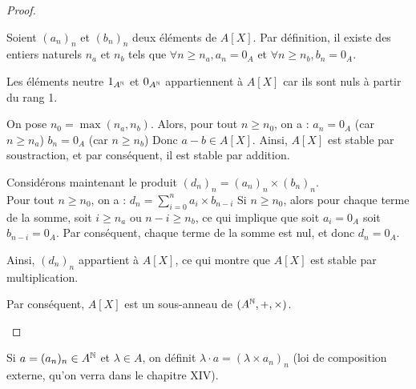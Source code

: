 \documentclass[12pt, a4paper]{report}
\begin{document}
\begin{proof}
    \begin{outline}
        \1 Soient $(a_n)_n$ et $(b_n)_n$ deux éléments de $A[X]$. Par définition, il existe des entiers naturels $n_a$ et $n_b$ tels que $\forall n \ge n_a, a_n = 0_A$ et $\forall n \ge n_b, b_n = 0_A$.

        \1 Les éléments neutre $1_{A^{\mathbb{N}}}$ et $0_{A^{\mathbb{N}}}$ appartiennent à $A[X]$ car ils sont nuls à partir du rang 1.

        \1 On pose $n_0 = \max(n_a, n_b)$. Alors, pour tout $n \ge n_0$, on a :
            \2 $a_n = 0_A$ (car $n \ge n_a$)
            \2 $b_n = 0_A$ (car $n \ge n_b$)
            \2 Donc $a-b \in A[X]$.
        \1 Ainsi, $A[X]$ est stable par soustraction, et par conséquent, il est stable par addition.

        \1 Considérons maintenant le produit $(d_n)_n = (a_n)_n \times (b_n)_n$.\\Pour tout $n \ge n_0$, on a :
            \2 $d_n = \sum_{i=0}^{n} a_i \times b_{n-i}$
            \2 Si $n \ge n_0$, alors pour chaque terme de la somme, soit $i \ge n_a$ ou $n-i \ge n_b$, ce qui implique que soit $a_i = 0_A$ soit $b_{n-i} = 0_A$. Par conséquent, chaque terme de la somme est nul, et donc $d_n = 0_A$.

        \1 Ainsi, $(d_n)_n$ appartient à $A[X]$, ce qui montre que $A[X]$ est stable par multiplication.

        \1 Par conséquent, $A[X]$ est un sous-anneau de $(A^{\mathbb{N}}, +, \times)$.
    \end{outline}
\end{proof}

\begin{remark}
    Si $a = (a_n)_n \in A^{\mathbb{N}}$ et $\lambda \in A$, on définit $\lambda \cdot a = (\lambda \times a_n)_n$ (loi de composition externe, qu'on verra dans le chapitre XIV).
\end{remark}
\end{document}
